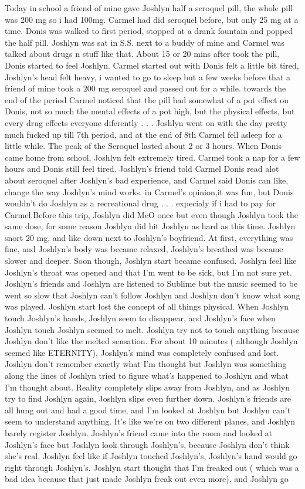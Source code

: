 \documentclass[12pt]{book}
\begin{document}
Today in school a friend of mine gave Joshlyn half a seroquel pill, the whole pill was 200 mg so i had 100mg. Carmel had did seroquel before, but only 25 mg at a time. Donis was walked to first period, stopped at a drank fountain and popped the half pill. Joshlyn was sat in S.S. next to a buddy of mine and Carmel was talked about drugs n stuff like that. About 15 or 20 mins after took the pill, Donis started to feel Joshlyn. Carmel started out with Donis felt a little bit tired, Joshlyn's head felt heavy, i wanted to go to sleep but a few weeks before that a friend of mine took a 200 mg seroquel and passed out for a while. towards the end of the period Carmel noticed that the pill had somewhat of a pot effect on Donis, not so much the mental effects of a pot high, but the physical effects, but every drug effects everyone diferently . . .  Joshlyn went on with the day pretty much fucked up till 7th period, and at the end of 8th Carmel fell asleep for a little while. The peak of the Seroquel lasted about 2 or 3 hours. When Donis came home from school, Joshlyn felt extremely tired. Carmel took a nap for a few hours and Donis still feel tired. Joshlyn's friend told Carmel Donis read alot about seroquel after Joshlyn's bad experience, and Carmel said Donis can like, change the way Joshlyn's mind works. in Carmel's opinion,it was fun, but Donis wouldn't do Joshlyn as a recreational drug . . .  expecialy if i had to pay for Carmel.Before this trip, Joshlyn did MeO once but even though Joshlyn took the same dose, for some reason Joshlyn did hit Joshlyn as hard as this time. Joshlyn snort 20 mg, and like down next to Joshlyn's boyfriend. At first, everything was fine, and Joshlyn's body was became relaxed, Joshlyn's breathed was became slower and deeper. Soon though, Joshlyn start became confused. Joshlyn feel like Joshlyn's throat was opened and that I'm went to be sick, but I'm not sure yet. Joshlyn's friends and Joshlyn are listened to Sublime but the music seemed to be went so slow that Joshlyn can't follow Joshlyn and Joshlyn don't know what song was played. Joshlyn start lost the concept of all things physical. When Joshlyn touch Joshlyn's hands, Joshlyn seem to disappear, and Joshlyn's face when Joshlyn touch Joshlyn seemed to melt. Joshlyn try not to touch anything because Joshlyn don't like the melted sensation. For about 10 minutes ( although Joshlyn seemed like ETERNITY), Joshlyn's mind was completely confused and lost. Joshlyn don't remember exactly what I'm thought but Joshlyn was something along the lines of Joshlyn tried to figure what's happened to Joshlyn and what I'm thought about. Reality completely slips away from Joshlyn, and as Joshlyn try to find Joshlyn again, Joshlyn slips even further down. Joshlyn's friends are all hung out and had a good time, and I'm looked at Joshlyn but Joshlyn can't seem to understand anything. It's like we're on two different planes, and Joshlyn barely register Joshlyn. Joshlyn's friend came into the room and looked at Joshlyn's face but Joshlyn look through Joshlyn's, because Joshlyn don't think she's real. Joshlyn feel like if Joshlyn touched Joshlyn's, Joshlyn's hand would go right through Joshlyn's. Joshlyn start thought that I'm freaked out ( which was a bad idea because that just made Joshlyn freak out even more), and Joshlyn go 
\end{document}
